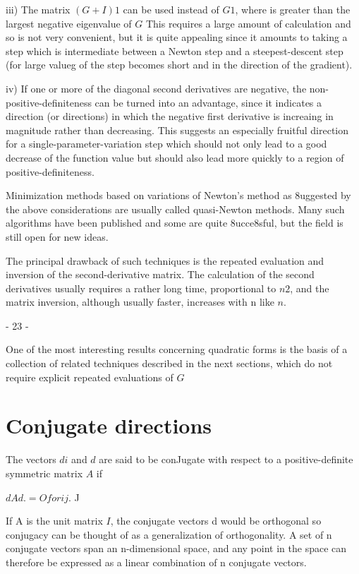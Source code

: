 iii) The matrix $(G +I) 1$ can be used instead of $G 1$, where  is greater
     than the largest negative eigenvalue of $G$  This requires a large
     amount of calculation and so is not very convenient, but it is
     quite appealing since it amounts to taking a step which is intermediate         between a Newton step and a steepest-descent step (for
     large valueg of  the step becomes short and in the direction of
     the gradient).
 
 iv) If one or more of the diagonal second derivatives are negative, the
     non-positive-definiteness can be turned into an advantage, since it
     indicates a direction (or directions) in which the negative first
     derivative is increaing in magnitude rather than decreasing.  This
     suggests an especially fruitful direction for a
single-parameter-variation step which should not only lead to a good
decrease of the
     function value but should also lead more quickly to a region of
     positive-definiteness.
 
     Minimization methods based on variations of Newton's method as
8uggested by the above considerations are usually called quasi-Newton
methods.  Many such algorithms have been published and some are quite
8ucce8sful, but the field is still open for new ideas.
 
     The principal drawback of such techniques is the repeated evaluation
 and inversion of the second-derivative matrix.  The calculation of
the second derivatives usually requires a rather long time, proportional
to $n2$, and the matrix inversion, although usually faster, increases with
n like $n$.
 
                                - 23 -
 
 
     One of the most interesting results concerning quadratic forms is
the basis of a collection of related techniques described in the next
sections, which do not require explicit repeated evaluations of $G$
 
 
\section{Conjugate directions}
 
     The vectors $di$ and $d$ are said to be conJugate with respect to a
positive-definite symmetric matrix $A$ if
 
 
                        $d Ad. = O   for   i  j $.
                            J
 
 
If A is the unit matrix $I$, the conjugate vectors d would be orthogonal
so conjugacy can be thought of as a generalization of orthogonality. A
set of n conjugate vectors span an n-dimensional space, and any point
in the space can therefore be expressed as a linear combination of n
conjugate vectors.
 
